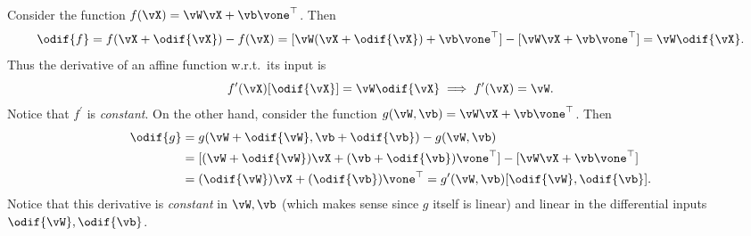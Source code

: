\documentclass[../../book-main.tex]{subfiles}
\begin{document}
\begin{example}
    Consider the function \(f(\vX) = \vW\vX + \vb\vone^{\top}\). Then
    \begin{equation}
        \odif{f} = f(\vX + \odif{\vX}) - f(\vX) = [\vW(\vX +
        \odif{\vX}) + \vb\vone^{\top}] - [\vW \vX + \vb \vone^{\top}]
        = \vW\odif{\vX}.
    \end{equation}
    Thus the derivative of an affine function w.r.t.~its input is
    \begin{equation}
        f^{\prime}(\vX)[\odif{\vX}] = \vW\odif{\vX} \implies
        f^{\prime}(\vX) = \vW.
    \end{equation}
    Notice that \(f^{\prime}\) is \textit{constant}. On the other
    hand, consider the function \(g(\vW, \vb) = \vW\vX + \vb\vone^{\top}\). Then
    \begin{align}
        \odif{g}
        &= g(\vW + \odif{\vW}, \vb + \odif{\vb}) - g(\vW, \vb)
        \\ 
        &=
        [(\vW + \odif{\vW})\vX + (\vb + \odif{\vb})\vone^{\top}] -
        [\vW\vX + \vb\vone^{\top}] \\
        &= (\odif{\vW})\vX + (\odif{\vb})\vone^{\top} =
        g^{\prime}(\vW, \vb)[\odif{\vW}, \odif{\vb}].
    \end{align}
    Notice that this derivative is \textit{constant} in \(\vW, \vb\)
    (which makes sense since \(g\) itself is linear) and linear in
    the differential inputs \(\odif{\vW}, \odif{\vb}\).
\end{example}
\end{document}
